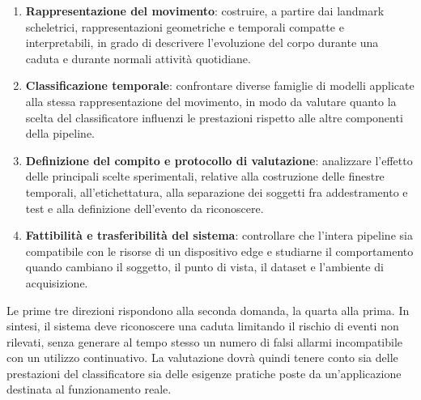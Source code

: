 \begin{enumerate}
    \item \textbf{Rappresentazione del movimento}: costruire, a partire dai
    landmark scheletrici, rappresentazioni geometriche e temporali compatte e
    interpretabili, in grado di descrivere l'evoluzione del corpo durante una
    caduta e durante normali attività quotidiane.

    \item \textbf{Classificazione temporale}: confrontare diverse famiglie di
    modelli applicate alla stessa rappresentazione del movimento, in modo da
    valutare quanto la scelta del classificatore influenzi le prestazioni
    rispetto alle altre componenti della pipeline.

    \item \textbf{Definizione del compito e protocollo di valutazione}:
    analizzare l'effetto delle principali scelte sperimentali, relative alla
    costruzione delle finestre temporali, all'etichettatura, alla separazione
    dei soggetti fra addestramento e test e alla definizione dell'evento da
    riconoscere.

    \item \textbf{Fattibilità e trasferibilità del sistema}: controllare che
    l'intera pipeline sia compatibile con le risorse di un dispositivo edge e
    studiarne il comportamento quando cambiano il soggetto, il punto di vista,
    il dataset e l'ambiente di acquisizione.
\end{enumerate}

Le prime tre direzioni rispondono alla seconda domanda, la quarta alla prima.
In sintesi, il sistema deve riconoscere una caduta limitando il rischio di
eventi non rilevati, senza generare al tempo stesso un numero di falsi
allarmi incompatibile con un utilizzo continuativo. La valutazione dovrà
quindi tenere conto sia delle prestazioni del classificatore sia delle
esigenze pratiche poste da un'applicazione destinata al funzionamento reale.
